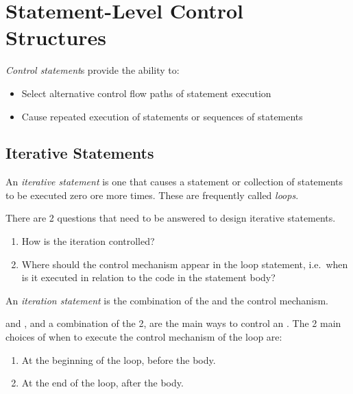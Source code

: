 \section{Statement-Level Control Structures}\label{sec:Statement_Level_Control_Structures}
\begin{definition}\label{def:Control_Statement}
  \emph{Control statement}s provide the ability to:
  \begin{itemize}[noitemsep]
  \item Select alternative control flow paths of statement execution
  \item Cause repeated execution of statements or sequences of statements
  \end{itemize}
\end{definition}

\subsection{Iterative Statements}\label{subsec:Iterative_Statements}
\begin{definition}\label{def:Iterative_Statement}
  An \emph{iterative statement} is one that causes a statement or collection of statements to be executed zero ore more times.
  These are frequently called \emph{loops}.

  There are 2 questions that need to be answered to design iterative statements.
  \begin{enumerate}[noitemsep]
  \item How is the iteration controlled?
  \item Where should the control mechanism appear in the loop statement, i.e.\ when is it executed in relation to the code in the statement body?
  \end{enumerate}

  \begin{remark}\label{rmk:Iteration_Statement}
    An \emph{iteration statement} is the combination of the  and the control mechanism.
  \end{remark}
\end{definition}

 and , and a combination of the 2, are the main ways to control an .
The 2 main choices of when to execute the control mechanism of the loop are:
\begin{enumerate}[noitemsep]
\item At the beginning of the loop, before the body. 
\item At the end of the loop, after the body. 
\end{enumerate}

